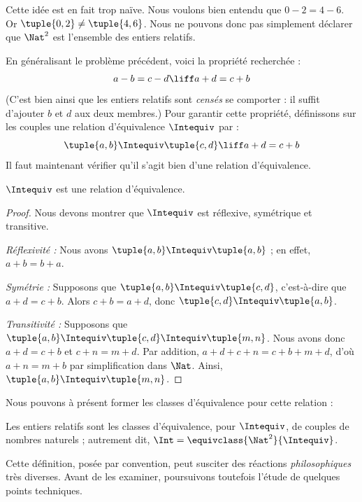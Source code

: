 \documentclass[11pt,a4paper,openany]{memoir}
\begin{document}
Cette idée est en fait trop naïve. Nous voulons bien entendu que $0- 2 = 4 - 6$. Or $\tuple{0, 2 }\neq \tuple{4, 6}$. Nous ne pouvons donc pas simplement déclarer que $\Nat^2$ est l'ensemble des entiers relatifs.

En généralisant le problème précédent, voici la propriété recherchée :
	$$a - b = c - d \liff a + d = c + b$$
(C'est bien ainsi que les entiers relatifs sont \emph{censés} se comporter : il suffit d'ajouter $b$ et $d$ aux deux membres.) Pour garantir cette propriété, définissons sur les couples une relation d'équivalence $\Intequiv$ par :
$$\tuple{ a, b } \Intequiv \tuple{c, d}\liff a + d = c + b$$
Il faut maintenant vérifier qu'il s'agit bien d'une relation d'équivalence.
\begin{prop} $\Intequiv$ est une relation d'équivalence.
\end{prop}
	\begin{proof}
	Nous devons montrer que $\Intequiv$ est réflexive, symétrique et transitive.
	
	\emph{Réflexivité :} Nous avons $\tuple{a, b} \Intequiv \tuple{a, b}$ ; en effet, $a + b = b + a$.
	
	\emph{Symétrie :} Supposons que $\tuple{a, b} \Intequiv \tuple{c, d}$, c'est-à-dire que $a + d = c + b$. Alors $c + b = a + d$, donc $\tuple{c, d} \Intequiv \tuple{a, b}$.
	
	\emph{Transitivité :} Supposons que $\tuple{a, b} \Intequiv \tuple{c, d}\Intequiv \tuple{m, n}$. Nous avons donc $a + d = c + b$ et $c + n = m + d$. Par addition, $a + d + c + n = c + b + m + d$, d'où $a + n = m + b$ par simplification dans $\Nat$. Ainsi, $\tuple{a, b } \Intequiv \tuple{m, n}$.
\end{proof}

Nous pouvons à présent former les classes d'équivalence pour cette relation :

\begin{defn}
		Les entiers relatifs sont les classes d'équivalence, pour $\Intequiv$, de couples de nombres naturels ; autrement dit, $\Int = \equivclass{\Nat^2}{\Intequiv}$.
\end{defn}

Cette définition, posée par convention, peut susciter des réactions \emph{philosophiques} très diverses. Avant de les examiner, poursuivons toutefois l'étude de quelques points techniques.
\end{document}
